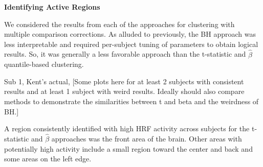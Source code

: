 \noindent \textbf{Identifying Active Regions}

We considered the results from each of the approaches for clustering with 
multiple comparison corrections. As alluded to previously, the BH approach was 
less interpretable and required per-subject tuning of parameters to obtain 
logical results. So, it was generally a less favorable approach than the 
t-statistic and $\hat{\beta}$ quantile-based clustering. 

Sub 1, Kent's actual, 
[Some plots here for at least 2 subjects with consistent results and at least 1 subject with weird results. Ideally should also compare methods to demonstrate the similarities between t and beta and the weirdness of BH.]

A region consistently identified with high HRF activity across subjects for the
t-statistic and $\hat{\beta}$ approaches was the front area of the brain. Other 
areas with potentially high activity include a small region toward the center 
and back and some areas on the left edge. 
\vspace{5mm}


